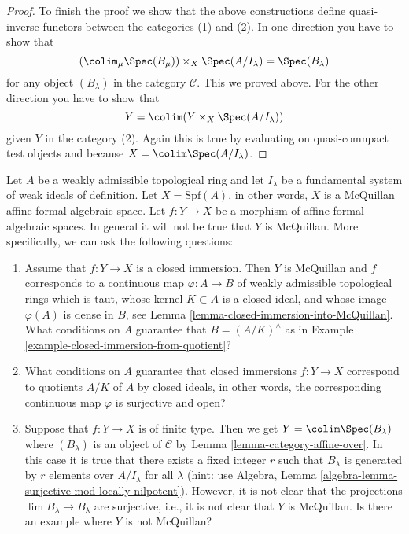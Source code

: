 \begin{proof}
\medskip\noindent
To finish the proof we show that the above constructions
define quasi-inverse functors between the categories (1) and (2).
In one direction you have to show that
$$
\left(\colim_\mu \Spec(B_\mu)\right) \times_X \Spec(A/I_\lambda) =
\Spec(B_\lambda)
$$
for any object $(B_\lambda)$ in the category $\mathcal{C}$.
This we proved above. For
the other direction you have to show that
$$
Y = \colim (Y \times_X \Spec(A/I_\lambda))
$$
given $Y$ in the category (2). Again this is true by evaluating on
quasi-comnpact test objects and because $X = \colim \Spec(A/I_\lambda)$.
\end{proof}

\begin{remark}
\label{remark-questions}
Let $A$ be a weakly admissible topological ring and let $I_\lambda$
be a fundamental system of weak ideals of definition. Let $X = \text{Spf}(A)$,
in other words, $X$ is a McQuillan affine formal algebraic space.
Let $f : Y \to X$ be a morphism of affine formal algebraic spaces.
In general it will not be true that $Y$ is McQuillan. More specifically,
we can ask the following questions:
\begin{enumerate}
\item Assume that $f : Y \to X$ is a closed immersion. Then
$Y$ is McQuillan and $f$ corresponds to a continuous map
$\varphi : A \to B$ of weakly admissible topological rings
which is taut, whose kernel $K \subset A$ is a closed ideal, and
whose image $\varphi(A)$ is dense in $B$, see
Lemma \ref{lemma-closed-immersion-into-McQuillan}.
What conditions on $A$ guarantee that $B = (A/K)^\wedge$ as in
Example \ref{example-closed-immersion-from-quotient}?
\item What conditions on $A$ guarantee that closed immersions
$f : Y \to X$ correspond to quotients $A/K$ of $A$ by closed ideals,
in other words, the corresponding continuous map $\varphi$ is surjective
and open?
\item Suppose that $f : Y \to X$ is of finite type. Then we get
$Y = \colim \Spec(B_\lambda)$ where $(B_\lambda)$ is an object of
$\mathcal{C}$ by Lemma \ref{lemma-category-affine-over}.
In this case it is true that there exists a fixed integer $r$ such
that $B_\lambda$ is generated by $r$ elements over $A/I_\lambda$ for
all $\lambda$ (hint: use
Algebra, Lemma \ref{algebra-lemma-surjective-mod-locally-nilpotent}).
However, it is not clear that the projections
$\lim B_\lambda \to B_\lambda$ are surjective, i.e.,
it is not clear that $Y$ is McQuillan.
Is there an example where $Y$ is not McQuillan?

\end{enumerate}
\end{remark}
